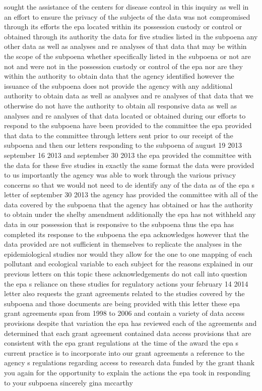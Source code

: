 \documentclass{article}
\begin{document}
sought the assistance of the centers for disease control in this inquiry as well in an effort to ensure the privacy of the subjects of the data was not compromised through its efforts the epa located within its possession custody or control or obtained through its authority the data for five studies listed in the subpoena any other data as well as analyses and re analyses of that data that may be within the scope of the subpoena whether specifically listed in the subpoena or not are not and were not in the possession custody or control of the epa nor are they within the authority to obtain data that the agency identified however the issuance of the subpoena does not provide the agency with any additional authority to obtain data as well as analyses and re analyses of that data that we otherwise do not have the authority to obtain all responsive data as well as analyses and re analyses of that data located or obtained during our efforts to respond to the subpoena have been provided to the committee the epa provided that data to the committee through letters sent prior to our receipt of the subpoena and then our letters responding to the subpoena of august 19 2013 september 16 2013 and september 30 2013 the epa provided the committee with the data for these five studies in exactly the same format the data were provided to us importantly the agency was able to work through the various privacy concerns so that we would not need to de identify any of the data as of the epa s letter of september 30 2013 the agency has provided the committee with all of the data covered by the subpoena that the agency has obtained or has the authority to obtain under the shelby amendment additionally the epa has not withheld any data in our possession that is responsive to the subpoena thus the epa has completed its response to the subpoena the epa acknowledges however that the data provided are not sufficient in themselves to replicate the analyses in the epidemiological studies nor would they allow for the one to one mapping of each pollutant and ecological variable to each subject for the reasons explained in our previous letters on this topic these acknowledgements do not call into question the epa s reliance on these studies for regulatory actions your february 14 2014 letter also requests the grant agreements related to the studies covered by the subpoena and those documents are being provided with this letter these epa grant agreements span from 1998 to 2006 and contain a variety of data access provisions despite that variation the epa has reviewed each of the agreements and determined that each grant agreement contained data access provisions that are consistent with the epa grant regulations at the time of the award the epa s current practice is to incorporate into our grant agreements a reference to the agency s regulations regarding access to research data funded by the grant thank you again for the opportunity to explain the actions the epa took in responding to your subpoena sincerely gina mccarthy\pagebreak
\end{document}
